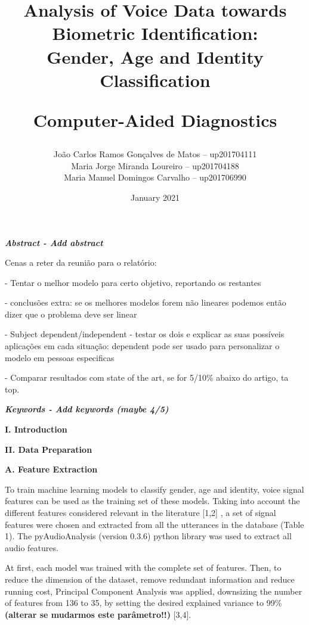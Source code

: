 \documentclass{article}
\title{\textbf{Analysis of Voice Data towards Biometric Identification:\\ Gender, Age and Identity Classification}\par Computer-Aided Diagnostics}
\author{
João Carlos Ramos Gonçalves de Matos – up201704111\\
Maria Jorge Miranda Loureiro – up201704188\\
Maria Manuel Domingos Carvalho – up201706990\\
}
\date{\nth{15} January 2021}
\begin{document}
\maketitle
\thispagestyle{empty} 

\justify
\normalsize
\setlength{\parindent}{0pt}

\textbf{\emph{Abstract - Add abstract} }
\vspace{2mm}

Cenas a reter da reunião para o relatório:\par
- Tentar o melhor modelo para certo objetivo, reportando os restantes\par
- conclusões extra: se os melhores modelos forem não lineares podemos então dizer que o problema deve ser linear\par
- Subject dependent/independent - testar os dois e explicar as suas possíveis aplicações em cada situação: dependent pode ser usado para personalizar o modelo em pessoas especificas\par
- Comparar resultados com state of the art, se for 5/10\% abaixo do artigo, ta top.\par


\textbf{\emph{Keywords - Add keywords (maybe 4/5) } }
\vspace{2mm}

\textbf{I. Introduction}\par

\vspace{2mm}
\textbf{II. Data Preparation }\par

\vspace{2mm}
\textbf{ A. Feature Extraction }\par
To train machine learning models to classify gender, age and identity, voice signal features can be used as the training set of these models. Taking into account the different features considered relevant in the literature [1,2] , a set of signal features were chosen and extracted from all the utterances in the database (Table 1). The pyAudioAnalysis (version 0.3.6) python library was used to extract all audio features.

At first, each model was trained with the complete set of features. Then, to reduce the dimension of the dataset, remove redundant information and reduce running cost, Principal Component Analysis was applied, downsizing the number of features from 136 to 35, by setting the desired explained variance to 99\% \textbf{(alterar se mudarmos este parâmetro!!) } [3,4].
\end{document}
